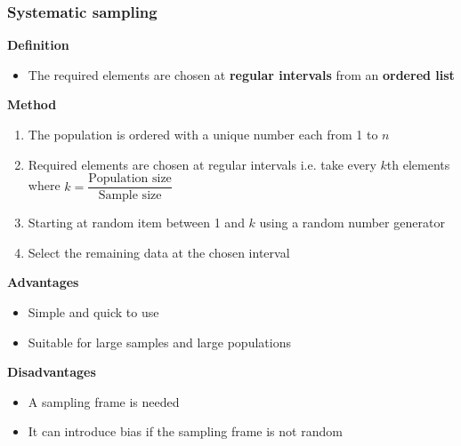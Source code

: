 \documentclass[A4paper, 11pt]{article}
\begin{document}
	\subsubsection{Systematic sampling}
	\textbf{Definition}
	\begin{itemize}
		\item The required elements are chosen at \textbf{regular intervals} from an \textbf{ordered list}
	\end{itemize}
	\textbf{Method}
	\begin{enumerate}
		\item The population is ordered with a unique number each from 1 to $n$
		\item Required elements are chosen at regular intervals i.e. take every $k$th elements where $k=\dfrac{\text{Population size}}{\text{Sample size}}$
		\item Starting at random item between 1 and $k$ using a random number generator
		\item Select the remaining data at the chosen interval
	\end{enumerate}
	\textbf{Advantages}
	\begin{itemize}
		\item Simple and quick to use
		\item Suitable for large samples and large populations
	\end{itemize}
	\textbf{Disadvantages}
	\begin{itemize}
		\item A sampling frame is needed
		\item It can introduce bias if the sampling frame is not random
	\end{itemize}
\end{document}
